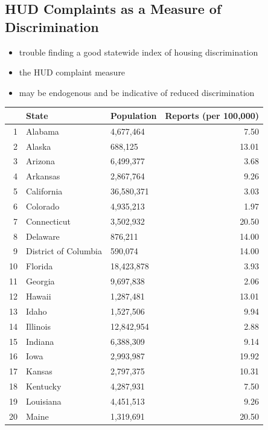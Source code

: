\documentclass{article}
\begin{document}
  \subsection{HUD Complaints as a Measure of Discrimination}
  
  \begin{itemize}
    \item trouble finding a good statewide index of housing discrimination
    \item the HUD complaint measure
    \item may be endogenous and be indicative of reduced discrimination
  
  \end{itemize}
\begin{table}[ht]
\centering
\begin{tabular}{rllr}
  \hline
 & State & Population & Reports (per 100,000) \\ 
  \hline
1 & Alabama & 4,677,464 & 7.50 \\ 
  2 & Alaska & 688,125 & 13.01 \\ 
  3 & Arizona & 6,499,377 & 3.68 \\ 
  4 & Arkansas & 2,867,764 & 9.26 \\ 
  5 & California & 36,580,371 & 3.03 \\ 
  6 & Colorado & 4,935,213 & 1.97 \\ 
  7 & Connecticut & 3,502,932 & 20.50 \\ 
  8 & Delaware & 876,211 & 14.00 \\ 
  9 & District of Columbia & 590,074 & 14.00 \\ 
  10 & Florida & 18,423,878 & 3.93 \\ 
  11 & Georgia & 9,697,838 & 2.06 \\ 
  12 & Hawaii & 1,287,481 & 13.01 \\ 
  13 & Idaho & 1,527,506 & 9.94 \\ 
  14 & Illinois & 12,842,954 & 2.88 \\ 
  15 & Indiana & 6,388,309 & 9.14 \\ 
  16 & Iowa & 2,993,987 & 19.92 \\ 
  17 & Kansas & 2,797,375 & 10.31 \\ 
  18 & Kentucky & 4,287,931 & 7.50 \\ 
  19 & Louisiana & 4,451,513 & 9.26 \\ 
  20 & Maine & 1,319,691 & 20.50 \\ 

\end{tabular}
\end{table}
\end{document}
